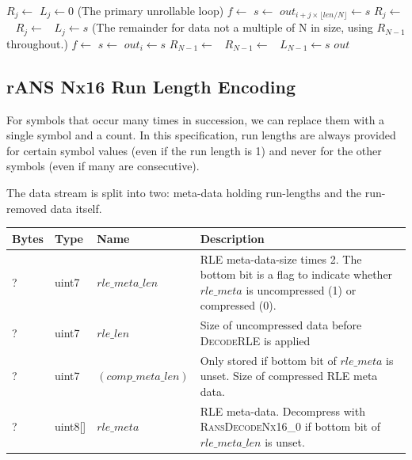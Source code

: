 \documentclass[a4paper]{article}
\begin{document}
\begin{algorithmic}[1]
  \State {}
    \State $R_j \gets$ 
    \State $L_j \gets 0$
  \EndFor
  \Statex (The primary unrollable loop)
        \State $f \gets$ 
      \State $s \gets$ 
      \State $out_{i + j \times \lfloor len/N \rfloor} \gets s$
      \State $R_j \gets$\ 
      \State $R_j \gets$\ 
      \State $L_j \gets s$
    \EndFor
  \EndFor
  \Statex (The remainder for data not a multiple of N in size, using $R_{N-1}$ throughout.)
    \State $f \gets$ 
    \State $s \gets$ 
    \State $out_i \gets s$
    \State $R_{N-1} \gets$\ 
    \State $R_{N-1} \gets$\ 
    \State $L_{N-1} \gets s$
  \EndFor
  \State \Return $out$
\EndFunction
\end{algorithmic}

\subsection{rANS Nx16 Run Length Encoding}
\label{sec:ransRLE}

For symbols that occur many times in succession, we can replace them
with a single symbol and a count.  In this specification, run lengths
are always provided for certain symbol values (even if the run length
is 1) and never for the other symbols (even if many are consecutive).

The data stream is split into two: meta-data holding run-lengths
and the run-removed data itself.

\begin{table}[h]
\centering
\begin{tabular}{lllp{9cm}}
\textbf{Bytes} & \textbf{Type} & \textbf{Name} & \textbf{Description}\\
\hline
? & uint7   & $rle\_meta\_len$     & RLE meta-data-size times 2. The bottom bit is a flag to indicate whether $rle\_meta$ is uncompressed (1) or compressed (0). \\
? & uint7   & $rle\_len$           & Size of uncompressed data before \textsc{DecodeRLE} is applied \\
? & uint7   & $(comp\_meta\_len)$  & Only stored if bottom bit of $rle\_meta$ is unset.  Size of compressed RLE meta data. \\
? & uint8[] & $rle\_meta$          & RLE meta-data.  Decompress with \textsc{RansDecodeNx16\_0} if bottom bit of $rle\_meta\_len$ is unset. \\
\end{tabular}
\end{table}
\end{document}
